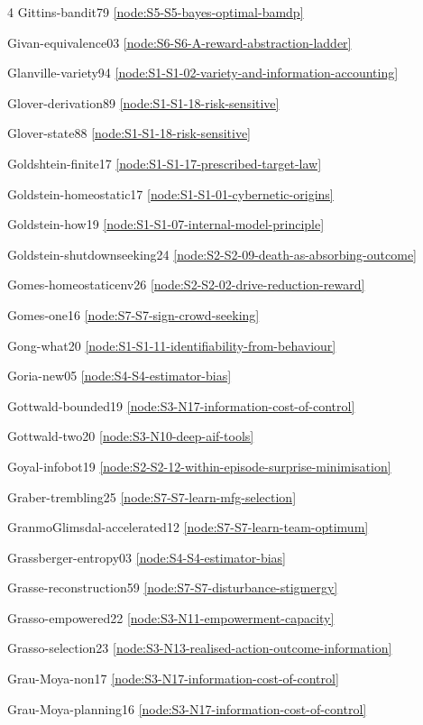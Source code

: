 \documentclass[10pt]{article}
\begin{document}
{\begin{multicols}{4}
Gittins-bandit79 \hfill \ref{node:S5-S5-bayes-optimal-bamdp}\par
Givan-equivalence03 \hfill \ref{node:S6-S6-A-reward-abstraction-ladder}\par
Glanville-variety94 \hfill \ref{node:S1-S1-02-variety-and-information-accounting}\par
Glover-derivation89 \hfill \ref{node:S1-S1-18-risk-sensitive}\par
Glover-state88 \hfill \ref{node:S1-S1-18-risk-sensitive}\par
Goldshtein-finite17 \hfill \ref{node:S1-S1-17-prescribed-target-law}\par
Goldstein-homeostatic17 \hfill \ref{node:S1-S1-01-cybernetic-origins}\par
Goldstein-how19 \hfill \ref{node:S1-S1-07-internal-model-principle}\par
Goldstein-shutdownseeking24 \hfill \ref{node:S2-S2-09-death-as-absorbing-outcome}\par
Gomes-homeostaticenv26 \hfill \ref{node:S2-S2-02-drive-reduction-reward}\par
Gomes-one16 \hfill \ref{node:S7-S7-sign-crowd-seeking}\par
Gong-what20 \hfill \ref{node:S1-S1-11-identifiability-from-behaviour}\par
Goria-new05 \hfill \ref{node:S4-S4-estimator-bias}\par
Gottwald-bounded19 \hfill \ref{node:S3-N17-information-cost-of-control}\par
Gottwald-two20 \hfill \ref{node:S3-N10-deep-aif-tools}\par
Goyal-infobot19 \hfill \ref{node:S2-S2-12-within-episode-surprise-minimisation}\par
Graber-trembling25 \hfill \ref{node:S7-S7-learn-mfg-selection}\par
GranmoGlimsdal-accelerated12 \hfill \ref{node:S7-S7-learn-team-optimum}\par
Grassberger-entropy03 \hfill \ref{node:S4-S4-estimator-bias}\par
Grasse-reconstruction59 \hfill \ref{node:S7-S7-disturbance-stigmergy}\par
Grasso-empowered22 \hfill \ref{node:S3-N11-empowerment-capacity}\par
Grasso-selection23 \hfill \ref{node:S3-N13-realised-action-outcome-information}\par
Grau-Moya-non17 \hfill \ref{node:S3-N17-information-cost-of-control}\par
Grau-Moya-planning16 \hfill \ref{node:S3-N17-information-cost-of-control}\par

\end{multicols}}
\end{document}
